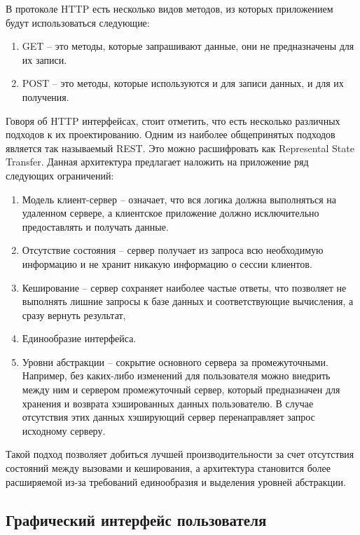 В протоколе HTTP есть несколько видов методов, из которых приложением будут использоваться следующие:

\begin{enumerate}
    \item GET -- это методы, которые запрашивают данные, они не предназначены для их записи.
    \item POST -- это методы, которые используются и для записи данных, и для их получения.
\end{enumerate}

Говоря об HTTP интерфейсах, стоит отметить, что есть несколько различных подходов к их проектированию. 
Одним из наиболее общепринятых подходов является так называемый REST.
Это можно расшифровать как Represental State Transfer\cite{REST}. Данная архитектура предлагает
наложить на приложение ряд следующих ограничений:

\begin{enumerate}
    \item Модель клиент-сервер -- означает, что вся логика должна выполняться на удаленном сервере,
    а клиентское приложение должно исключительно предоставлять и получать данные.
    \item Отсутствие состояния -- сервер получает из запроса всю необходимую информацию и не хранит
    никакую информацию о сессии клиентов.
    \item Кеширование -- сервер сохраняет наиболее частые ответы, что позволяет не выполнять
    лишние запросы к базе данных и соответствующие вычисления, а сразу вернуть результат,
    \item Единообразие интерфейса.
    \item Уровни абстракции -- сокрытие основного сервера за промежуточными. Например, без каких-либо
    изменений для пользователя можно внедрить между ним и сервером промежуточный сервер, который
    предназначен для хранения и возврата хэшированных данных пользователю. В случае отсутствия этих данных
    хэширующий сервер перенаправляет запрос исходному серверу.
\end{enumerate}

Такой подход позволяет добиться лучшей производительности за счет отсутствия состояний между
вызовами и кеширования, а архитектура становится более расширяемой из-за требований
единообразия и выделения уровней абстракции.

\subsection*{Графический интерфейс пользователя}

